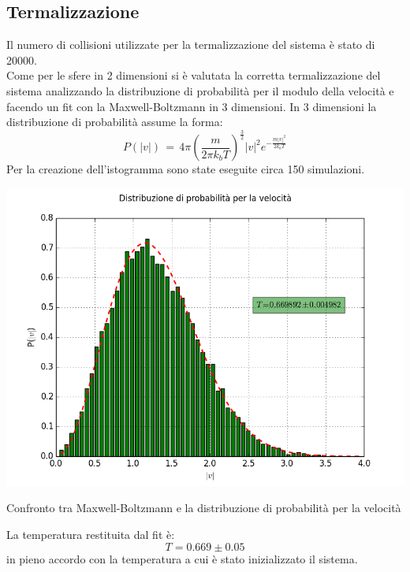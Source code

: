 \subsection{Termalizzazione}
Il numero di collisioni utilizzate per la termalizzazione del sistema è stato di 20000.\\
Come per le sfere in 2 dimensioni si è valutata la corretta termalizzazione del sistema analizzando la distribuzione di probabilità per il modulo della velocità e facendo un fit con la Maxwell-Boltzmann in 3 dimensioni.
In 3 dimensioni la distribuzione di probabilità assume la forma:
$$
	P(|v|) \, = \, 4 \pi \left(\frac{m}{2 \pi k_{b} T}\right)^{\frac{3}{2}} |v|^2 e^{-\frac{m |v|^2}{2 k_b T}}
$$
Per la creazione dell'istogramma sono state eseguite circa 150 simulazioni.
\begin{myfig}
	\includegraphics[scale=0.5]{sfere3D/boltzmann.png}
	\caption{Confronto tra Maxwell-Boltzmann e la distribuzione di probabilità per la velocità}
\end{myfig}
La temperatura restituita dal fit è:
$$
	T = 0.669 \pm 0.05
$$
in pieno accordo con la temperatura a cui è stato inizializzato il sistema.




